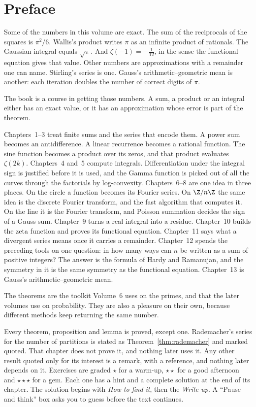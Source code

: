 \chapter*{Preface}
Some of the numbers in this volume are exact. The sum of the reciprocals of the squares is $\pi^2/6$. Wallis's product writes $\pi$ as an infinite product of rationals. The Gaussian integral equals $\sqrt\pi$. And $\zeta(-1)=-\frac1{12}$, in the sense the functional equation gives that value. Other numbers are approximations with a remainder one can name. Stirling's series is one. Gauss's arithmetic--geometric mean is another: each iteration doubles the number of correct digits of $\pi$.

The book is a course in getting those numbers. A sum, a product or an integral either has an exact value, or it has an approximation whose error is part of the theorem.

Chapters~1--3 treat finite sums and the series that encode them. A power sum becomes an antidifference. A linear recurrence becomes a rational function. The sine function becomes a product over its zeros, and that product evaluates $\zeta(2k)$. Chapters~4 and~5 compute integrals. Differentiation under the integral sign is justified before it is used, and the Gamma function is picked out of all the curves through the factorials by log-convexity. Chapters~6--8 are one idea in three places. On the circle a function becomes its Fourier series. On $\Z/n\Z$ the same idea is the discrete Fourier transform, and the fast algorithm that computes it. On the line it is the Fourier transform, and Poisson summation decides the sign of a Gauss sum. Chapter~9 turns a real integral into a residue. Chapter~10 builds the zeta function and proves its functional equation. Chapter~11 says what a divergent series means once it carries a remainder. Chapter~12 spends the preceding tools on one question: in how many ways can $n$ be written as a sum of positive integers? The answer is the formula of Hardy and Ramanujan, and the symmetry in it is the same symmetry as the functional equation. Chapter~13 is Gauss's arithmetic--geometric mean.

The theorems are the toolkit Volume~6 uses on the primes, and that the later volumes use on probability. They are also a pleasure on their own, because different methods keep returning the same number.

Every theorem, proposition and lemma is proved, except one. Rademacher's series for the number of partitions is stated as Theorem~\ref{thm:rademacher} and marked quoted. That chapter does not prove it, and nothing later uses it. Any other result quoted only for its interest is a remark, with a reference, and nothing later depends on it. Exercises are graded \textbf{$\star$} for a warm-up, \textbf{$\star\star$} for a good afternoon and \textbf{$\star\star\star$} for a gem. Each one has a hint and a complete solution at the end of its chapter. The solution begins with \emph{How to find it}, then the \emph{Write-up}. A ``Pause and think'' box asks you to guess before the text continues.

